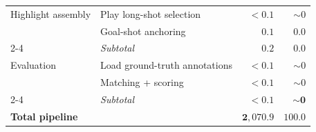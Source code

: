 \begin{table}[!tbp]
\begin{tabular}{llrr}
\midrule
Highlight assembly & Play long-shot selection & $< 0.1$ & $\sim 0$ \\
 & Goal-shot anchoring & $0.1$ & $0.0$ \\
\cmidrule(lr){2-4}
 & \textit{Subtotal} & $\mathbf{0.2}$ & $\mathbf{0.0}$ \\
\midrule
Evaluation & Load ground-truth annotations & $< 0.1$ & $\sim 0$ \\
 & Matching + scoring & $< 0.1$ & $\sim 0$ \\
\cmidrule(lr){2-4}
 & \textit{Subtotal} & $\mathbf{< 0.1}$ & $\mathbf{\sim 0}$ \\
\midrule
\multicolumn{2}{l}{\textbf{Total pipeline}} & $\mathbf{2{,}070.9}$ & $\mathbf{100.0}$ \\
\bottomrule
\end{tabular}
\end{table}

